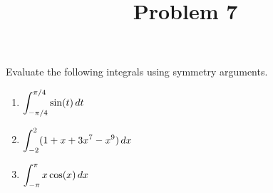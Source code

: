 \documentclass{ximera}
\title[Problem 7]{Problem 7}
\begin{document}
\begin{abstract} \end{abstract}
\maketitle

\begin{problem}
Evaluate the following integrals using symmetry arguments.

\begin{enumerate}

   \item    $\displaystyle \int_{-\pi/4}^{\pi/4} \sin(t) \,d t$

\item $\displaystyle \int_{-2}^2 (1+x+3x^7-x^9) \,d x$

\item
     $\displaystyle \int_{-\pi}^{\pi} x\cos(x) \,d x$ 
      
\end{enumerate}
\end{problem}
\end{document}
